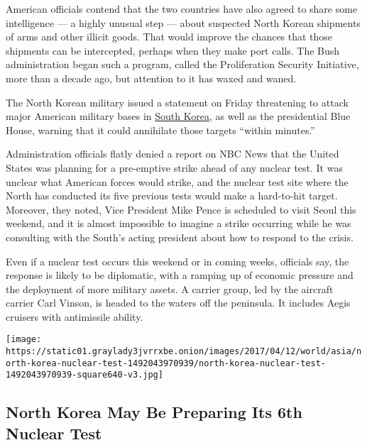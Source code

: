 American officials contend that the two countries have also agreed to
share some intelligence --- a highly unusual step --- about suspected
North Korean shipments of arms and other illicit goods. That would
improve the chances that those shipments can be intercepted, perhaps
when they make port calls. The Bush administration began such a program,
called the Proliferation Security Initiative, more than a decade ago,
but attention to it has waxed and waned.

The North Korean military issued a statement on Friday threatening to
attack major American military bases in
\href{https://www.nytimes3xbfgragh.onion/topic/destination/south-korea?8qa}{South
Korea}, as well as the presidential Blue House, warning that it could
annihilate those targets ``within minutes.''

Administration officials flatly denied a report on NBC News that the
United States was planning for a pre-emptive strike ahead of any nuclear
test. It was unclear what American forces would strike, and the nuclear
test site where the North has conducted its five previous tests would
make a hard-to-hit target. Moreover, they noted, Vice President Mike
Pence is scheduled to visit Seoul this weekend, and it is almost
impossible to imagine a strike occurring while he was consulting with
the South's acting president about how to respond to the crisis.

Even if a nuclear test occurs this weekend or in coming weeks, officials
say, the response is likely to be diplomatic, with a ramping up of
economic pressure and the deployment of more military assets. A carrier
group, led by the aircraft carrier Carl Vinson, is headed to the waters
off the peninsula. It includes Aegis cruisers with antimissile ability.

\href{https://www.nytimes3xbfgragh.onion/interactive/2017/04/12/world/asia/north-korea-nuclear-test.html}{}

\texttt{[image: https://static01.graylady3jvrrxbe.onion/images/2017/04/12/world/asia/north-korea-nuclear-test-1492043970939/north-korea-nuclear-test-1492043970939-square640-v3.jpg]}

\hypertarget{north-korea-may-be-preparing-its-6th-nuclear-test}{%
\subsection{North Korea May Be Preparing Its 6th Nuclear
Test}\label{north-korea-may-be-preparing-its-6th-nuclear-test}}

